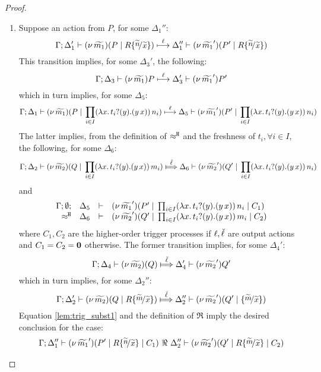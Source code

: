 \begin{proof}
	\begin{enumerate}
		\item	Suppose an action from $P$, for some $\Delta_1''$:
		\[
					\horel{\Gamma}{\Delta_1'}{\newsp{\widetilde{m_1}}{P \Par R \subst{\widetilde{n}}{\widetilde{x}} }}
					{\hby{\ell}}
					{\Delta_1''}{\newsp{\widetilde{m_1}'}{P' \Par R \subst{\widetilde{n}}{\widetilde{x}} }}
				\]
				This transition implies, for some $\Delta_3'$, the following:
				\[
					\Gamma; \Delta_3 \vdash (\nu\, \widetilde{m_1}){P} \stackrel{\ell}{\longmapsto} \Delta_3' \vdash (\nu\, \widetilde{m_1}'){P'}
				\]
				which in turn implies, for some $\Delta_5$:
				\[
					\Gamma; \Delta_1 \vdash (\nu\, \widetilde{m_1})(P \;|\; \prod_{i \in I} (\lambda x.\,t_i ? (y) . (y\, {x}))\, {n_i} ) \stackrel{\ell}{\longmapsto} \Delta_5 \vdash (\nu\, \widetilde{m_1}')(P' \;|\; \prod_{i \in I} (\lambda x.\,t_i ? (y) . (y\, {x}))\, {n_i} )
				\]
				The latter implies, from the definition of $\approx^\mathtt{H}$ and the
				freshness of $t_i, \forall i \in I$, the following,  for some $\Delta_6$:
				\[
					\horel{\Gamma}{\Delta_2}{\newsp{\widetilde{m_2}}{Q \Par \prod_{i \in I} \appl{(\trvalx{t_i})}{m_i} }}
					{\Hby{\mact{\ell}}}
					{\Delta_6}{\newsp{\widetilde{m_2}'}{Q' \Par \prod_{i \in I} \appl{(\trvalx{t_i})}{n_i} }}
				\]
				and
				\begin{eqnarray}
					\begin{array}{rcll} \Gamma; \emptyset; &\Delta_5& \vdash& (\nu\, \widetilde{m_1}')(P' \;|\; \prod_{i \in I} (\lambda x.\,t_i ? (y) . (y\, {x}))\, {n_i} \;|\; C_1)\\ \approx^\mathtt{H} &\Delta_6& \vdash &  (\nu\, \widetilde{m_2}')(Q' \;|\; \prod_{i \in I} (\lambda x.\,t_i ? (y) . (y\, {x}))\, {m_i} \;|\; C_2) \end{array}
					\label{lem:trig_subst1}
				\end{eqnarray}
				where $C_1, C_2$ are the higher-order trigger processes if $\ell, \breve{\ell}$ are output actions
				and $C_1 = C_2 = \mathbf{0}$ otherwise.
				The former transition implies, for some $\Delta_4'$:
				\[
					\horel{\Gamma}{\Delta_4}{\newsp{\widetilde{m_2}}{Q }}
					{\Hby{\mact{\ell}}}
					{\Delta_4'}{\news{\widetilde{m_2}'}{Q'}}
				\]
				which in turn implies, for some $\Delta_2''$:
				\[
					\horel{\Gamma}{\Delta_2'}{\newsp{\widetilde{m_2}}{Q \Par R \subst{\widetilde{m}}{\widetilde{x}}}}
					{\Hby{\mact{\ell}}}
					{\Delta_2''}{\newsp{\widetilde{m_2}'}{Q' \Par \subst{\widetilde{m}}{\widetilde{x}} }}
				\]
				Equation \eqref{lem:trig_subst1} and the definition of $\Re$ imply the desired conclusion for the case:
				\begin{eqnarray*}
					\horel{\Gamma}{\Delta_1''}{\newsp{\widetilde{m_1}'}{P' \Par R \subst{\widetilde{n}}{\widetilde{x}} \Par C_1}}
					{\ \Re\ }
					{\Delta_2''}{\newsp{\widetilde{m_2}'}{Q' \Par R \subst{\widetilde{m}}{\widetilde{x}} \Par C_2 }}

\end{eqnarray*}
\end{enumerate}
\end{proof}
